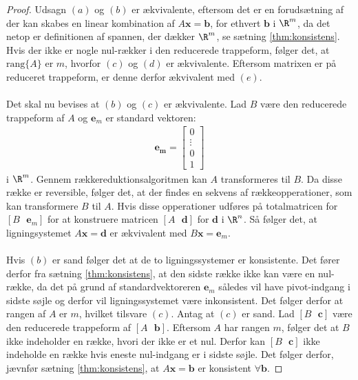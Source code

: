 \begin{proof}
%
Udsagn $(a)$ og $(b)$ er ækvivalente, eftersom det er en forudsætning af der kan skabes en linear kombination af $A\mathbf{x} =\mathbf{b}$, for ethvert $\mathbf{b}$ i $\R^m$, da det netop er definitionen af spannen, der dækker $\R^m$,
se sætning \ref{thm:konsistens}.
%
Hvis der ikke er nogle nul-rækker i den reducerede trappeform, følger det, at $\text{rang}\{A\}$ er $m$, hvorfor $(c)$ og $(d)$ er ækvivalente. 
Eftersom matrixen er på reduceret trappeform, er denne derfor ækvivalent med $(e)$.
\\\\
Det skal nu bevises at $(b)$ og $(c)$ er ækvivalente. 
Lad $B$ være den reducerede trappeform af $A$ og $\mathbf{e}_m$ er standard vektoren:
%
\begin{align*}
\mathbf{\mathbf{e}_m} = \begin{bmatrix}
		0 \\
        \vdots \\
        0 \\
        1 
\end{bmatrix}
\end{align*}
%
i $\R^m$. 
Gennem rækkereduktionsalgoritmen kan $A$ transformeres til $B$. 
Da disse række er reversible, følger det, at der findes en sekvens af rækkeopperationer, som kan transformere $B$ til $A$.
Hvis disse opperationer udføres på totalmatricen for 
$[B \text{    } \mathbf{e}_m]$ 
for at konstruere matricen 
$[A \text{    } \mathbf{d}]$ 
for $\mathbf{d}$ i $\R^n$. 
Så følger det, at ligningsystemet $A\mathbf{x}=\mathbf{
d}$ er ækvivalent med $B\mathbf{x}=\mathbf{e}_m$.
\\\\
Hvis $(b)$ er sand følger det at de to ligningssystemer er konsistente. 
Det fører derfor fra sætning \ref{thm:konsistens}, at den sidste række ikke kan være en nul-række, da det på grund af standardvektoreren $\mathbf{e}_m$ således vil have pivot-indgang i sidste søjle og derfor vil ligningssystemet være inkonsistent.
Det følger derfor at rangen af $A$ er $m$, hvilket tilsvare $(c)$.
Antag at $(c)$ er sand. 
Lad $[B \text{    } \mathbf{c}]$ 
være den reducerede trappeform af 
$[A \text{    } \mathbf{b}]$.
Eftersom $A$ har rangen $m$, følger det at $B$ ikke indeholder en række, hvori der ikke er et nul.  
Derfor kan $[B \text{    } \mathbf{c}]$ ikke indeholde en række hvis eneste nul-indgang er i sidste søjle. 
Det følger derfor, jævnfør sætning \ref{thm:konsistens}, at $A\mathbf{x}=\mathbf{b}$ er konsistent $\forall \mathbf{b}$.
%
\end{proof}
